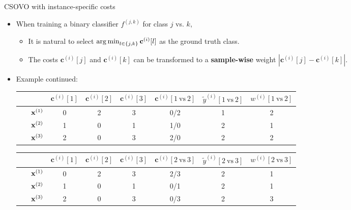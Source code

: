 \documentclass[11pt,compress,t,notes=noshow, xcolor=table]{beamer}
\newcommand{\cv}{\mathbf{c}}    %
\begin{document}
\begin{vbframe}{CSOVO with instance-specific costs \href{https://proceedings.mlr.press/v39/lin14.pdf}{}}
    \footnotesize
    \begin{itemize}
        \item When training a binary classifier $f^{(j, k)}$ for class $j$ vs. $k$,
        \begin{itemize}
            \footnotesize
            \item It is natural to select $\argmin_{l \in \{j, k\}} \cv^{(i)}[l]$ as the ground truth class.
            \vspace{5pt}
            
            \item The costs $\cv^{(i)}[j]$ and $\cv^{(i)}[k]$ can be transformed to a \textbf{sample-wise} weight $|\cv^{(i)}[j] - \cv^{(i)}[k]|$.
            \vspace{5pt}

            \vspace{5pt}
        \end{itemize}
        
        \item Example continued:
\begin{center}
    
                            \begin{tabular}{cc|ccc|ccc}\
        			& & $\cv^{(i)}[1]$ & $\cv^{(i)}[2]$ & $\cv^{(i)}[3]$ & $\cv^{(i)}[1 \ \text{vs} \ 2]$ & $\tilde{y}^{( i)}[1 \ \text{vs} \ 2]$ & $w^{(i)}[1 \ \text{vs} \ 2]$\\
        			\hline & $\mathbf{x}^{(1)}$ & 0 & 2 & 3 & 0/2 & 1 & 2\\
        			& $\mathbf{x}^{(2)}$ & 1 & 0 & 1 & 1/0 & 2 & 1 \\
                 	& $\mathbf{x}^{(3)}$ & 2 & 0 & 3 & 2/0 & 2 & 2\\
                \end{tabular}

            \vspace{5pt}
                            \begin{tabular}{cc|ccc|ccc}\
        			& & $\cv^{(i)}[1]$ & $\cv^{(i)}[2]$ & $\cv^{(i)}[3]$ & $\cv^{(i)}[2 \ \text{vs} \ 3]$ & $\tilde{y}^{( i)}[2 \ \text{vs} \ 3]$ & $w^{(i)}[2 \ \text{vs} \ 3]$\\
        			\hline & $\mathbf{x}^{(1)}$ & 0 & 2 & 3 & 2/3 & 2 & 1\\
        			& $\mathbf{x}^{(2)}$ & 1 & 0 & 1 & 0/1 & 2 & 1\\
                 	& $\mathbf{x}^{(3)}$ & 2 & 0 & 3 & 0/3 & 2 & 3\\
                \end{tabular}
\end{center}

    \end{itemize}
\end{vbframe}
\end{document}

